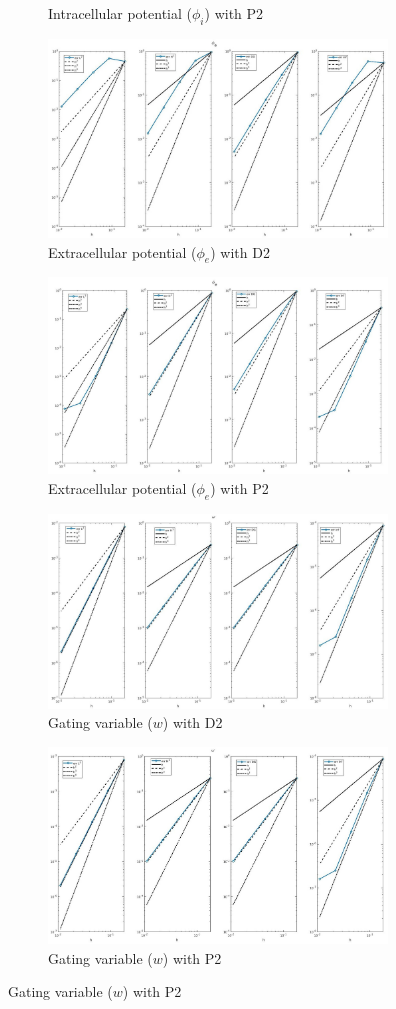 \documentclass[a4paper,11pt]{article}
\begin{document}
\begin{figure}[h]
\begin{subfigure}{0.5\textwidth}
\caption{Intracellular potential ($\phi_i$) with P2}
\end{subfigure}
\begin{subfigure}{0.5\textwidth}
\includegraphics[width = 9cm]{./D2_Phie_1.jpg}
\caption{Extracellular potential ($\phi_e$) with D2}
\end{subfigure}
\begin{subfigure}{0.5\textwidth}
\includegraphics[width =9cm]{./P2_Phie_1.jpg}
\caption{Extracellular potential ($\phi_e$) with P2}
\end{subfigure}
\begin{subfigure}{0.5\textwidth}
\includegraphics[width = 9cm]{./D2_w_1.jpg}
\caption{Gating variable ($w$) with D2}
\end{subfigure}
\begin{subfigure}{0.5\textwidth}
\includegraphics[width =9cm]{./P2_w_1.jpg}
\caption{Gating variable ($w$) with P2}
\end{subfigure}
\end{figure}
\end{document}
